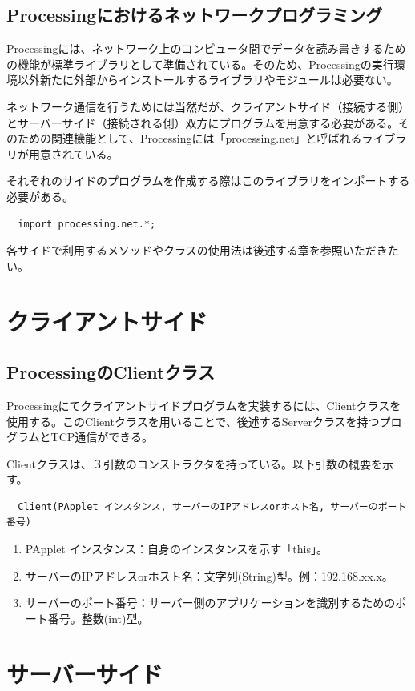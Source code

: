 \documentclass[dvipdfmx]{jsarticle}
\begin{document}
\subsection{Processingにおけるネットワークプログラミング}
Processingには、ネットワーク上のコンピュータ間でデータを読み書きするための機能が標準ライブラリとして準備されている。そのため、Processingの実行環境以外新たに外部からインストールするライブラリやモジュールは必要ない。\par
ネットワーク通信を行うためには当然だが、クライアントサイド（接続する側）とサーバーサイド（接続される側）双方にプログラムを用意する必要がある。そのための関連機能として、Processingには「processing.net」と呼ばれるライブラリが用意されている。\par
それぞれのサイドのプログラムを作成する際はこのライブラリをインポートする必要がある。\par
\begin{verbatim}
  import processing.net.*;
\end{verbatim}
各サイドで利用するメソッドやクラスの使用法は後述する章を参照いただきたい。
\section{クライアントサイド}
\subsection{ProcessingのClientクラス}
Processingにてクライアントサイドプログラムを実装するには、Clientクラスを使用する。このClientクラスを用いることで、後述するServerクラスを持つプログラムとTCP通信ができる。\par
Clientクラスは、３引数のコンストラクタを持っている。以下引数の概要を示す。
\begin{verbatim}
  Client(PApplet インスタンス, サーバーのIPアドレスorホスト名, サーバーのポート番号)
\end{verbatim}
\begin{enumerate}
  \item PApplet インスタンス：自身のインスタンスを示す「this」。
  \item サーバーのIPアドレスorホスト名：文字列(String)型。例：192.168.xx.x。
  \item サーバーのポート番号：サーバー側のアプリケーションを識別するためのポート番号。整数(int)型。
\end{enumerate}


\section{サーバーサイド}
\end{document}
